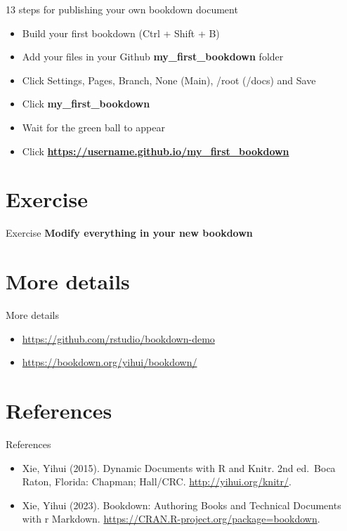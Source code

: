 \documentclass[
  ignorenonframetext,
]{beamer}
\providecommand{\tightlist}{%
  \setlength{\itemsep}{0pt}\setlength{\parskip}{0pt}}
\begin{document}
\begin{frame}{13 steps for publishing your own bookdown document}
\protect\hypertarget{steps-for-publishing-your-own-bookdown-document-4}{}
\begin{itemize}
\tightlist
\item
  Build your first bookdown (Ctrl + Shift + B)
\item
  Add your files in your Github \textbf{my\_first\_bookdown} folder
\item
  Click Settings, Pages, Branch, None (Main), /root (/docs) and Save
\item
  Click \textbf{my\_first\_bookdown}
\item
  Wait for the green ball to appear
\item
  Click \textbf{\url{https://username.github.io/my_first_bookdown}}
\end{itemize}
\end{frame}

\hypertarget{exercise}{%
\section{Exercise}\label{exercise}}

\begin{frame}{Exercise}
\protect\hypertarget{exercise-1}{}
\textbf{Modify everything in your new bookdown}
\end{frame}

\hypertarget{more-details}{%
\section{More details}\label{more-details}}

\begin{frame}{More details}
\protect\hypertarget{more-details-1}{}
\begin{itemize}
\tightlist
\item
  \url{https://github.com/rstudio/bookdown-demo}
\item
  \url{https://bookdown.org/yihui/bookdown/}
\end{itemize}
\end{frame}

\hypertarget{references}{%
\section{References}\label{references}}

\begin{frame}{References}
\protect\hypertarget{references-1}{}
\begin{itemize}
\item
  Xie, Yihui (2015). Dynamic Documents with R and Knitr. 2nd ed.~Boca
  Raton, Florida: Chapman; Hall/CRC. \url{http://yihui.org/knitr/}.
\item
  Xie, Yihui (2023). Bookdown: Authoring Books and Technical Documents
  with r Markdown. \url{https://CRAN.R-project.org/package=bookdown}.
\end{itemize}
\end{frame}
\end{document}

